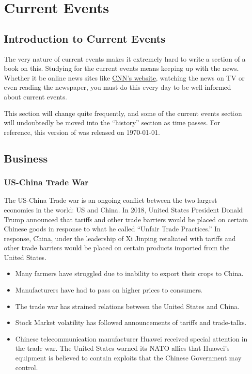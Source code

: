 \chapter{Current Events}

	\section{Introduction to Current Events}
		The very nature of current events makes it extremely hard to write a section of a book on this.  Studying for the current events means keeping up with the news.  Whether it be online news sites like \href{http://www.cnn.com}{CNN's website}, watching the news on TV or even reading the newspaper, you must do this every day to be well informed about current events.  
		
		This section will change quite frequently, and some of the current events section will undoubtedly be moved into the ``history'' section as time passes.  For reference, this version of \mytitle was released on \today. 
				
	\section{Business}
		\subsection{US-China Trade War}
		The US-China Trade war is an ongoing conflict between the two largest economies in the world: US and China.  In 2018, United States President Donald Trump announced that tariffs and other trade barriers would be placed on certain Chinese goods in response to what he called ``Unfair Trade Practices.''  In response, China, under the leadership of Xi Jinping retaliated with tariffs and other trade barriers would be placed on certain products imported from the United States.  
		
		\begin{itemize}
			\item Many farmers have struggled due to inability to export their crops to China.
			\item Manufacturers have had to pass on higher prices to consumers. 
			\item The trade war has strained relations between the United States and China.
			\item Stock Market volatility has followed announcements of tariffs and trade-talks.  
			\item Chinese telecommunication manufacturer Huawei received special attention in the trade war.  The United States warned its NATO allies that Huawei's equipment is believed to contain exploits that the Chinese Government may control.  

			
		\end{itemize}
